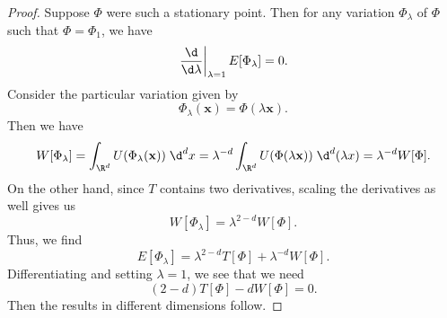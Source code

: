 \documentclass[a4paper]{article}
\begin{document}
\begin{proof}
  Suppose $\Phi$ were such a stationary point. Then for any variation $\Phi_\lambda$ of $\Phi$ such that $\Phi = \Phi_1$, we have
  \[
    \left.\frac{\d}{\d \lambda}\right|_{\lambda = 1}E[\Phi_\lambda] = 0.
  \]
  Consider the particular variation given by
  \[
    \Phi_\lambda(\mathbf{x}) = \Phi(\lambda \mathbf{x}).
  \]
  Then we have
  \[
    W[\Phi_\lambda] = \int_{\R^d} U(\Phi_\lambda(\mathbf{x})) \;\d^d x = \lambda^{-d} \int_{\R^d} U(\Phi(\lambda \mathbf{x}))\;\d^d (\lambda x) = \lambda^{-d} W[\Phi].
  \]
  On the other hand, since $T$ contains two derivatives, scaling the derivatives as well gives us
  \[
    W[\Phi_\lambda] = \lambda^{2 -d} W[\Phi].
  \]
  Thus, we find
  \[
    E[\Phi_\lambda] = \lambda^{2 - d}T[\Phi] + \lambda^{-d} W[\Phi].
  \]
  Differentiating and setting $\lambda = 1$, we see that we need
  \[
    (2 - d) T[\Phi] - d W[\Phi] = 0.
  \]
  Then the results in different dimensions follow.
\end{proof}
%
%
%
\end{document}
